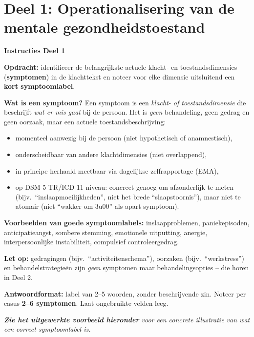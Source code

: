 \documentclass[11pt,a4paper]{article}
\begin{document}
\newpage


\section{Deel 1: Operationalisering van de mentale gezondheidstoestand}

\begin{tcolorbox}[colback=blue!3,colframe=PrimaryBlue,arc=2.5mm,boxrule=0.9pt,
  left=10pt,right=10pt,top=9pt,bottom=9pt]
\textbf{\color{PrimaryBlue}Instructies Deel 1}

\smallskip\small
\textbf{Opdracht:} identificeer de belangrijkste actuele klacht- en toestandsdimensies
(\textbf{symptomen}) in de klachttekst en noteer voor elke dimensie uitsluitend een
\textbf{kort symptoomlabel}.

\textbf{Wat is een symptoom?}
Een symptoom is een \emph{klacht- of toestandsdimensie} die beschrijft \emph{wat er
mis gaat} bij de persoon. Het is \emph{geen} behandeling, geen gedrag en geen oorzaak,
maar een actuele toestandsbeschrijving:
\begin{itemize}[topsep=2pt,itemsep=1pt]
\item momenteel aanwezig bij de persoon (niet hypothetisch of anamnestisch),
\item onderscheidbaar van andere klachtdimensies (niet overlappend),
\item in principe herhaald meetbaar via dagelijkse zelfrapportage (EMA),
\item op DSM-5-TR/ICD-11-niveau: concreet genoeg om afzonderlijk te meten (bijv.\ ``inslaapmoeilijkheden'', niet het brede ``slaapstoornis''), maar niet te atomair (niet ``wakker om 3u00'' als apart symptoom).
\end{itemize}

\textbf{Voorbeelden van goede symptoomlabels:}
inslaapproblemen, paniekepisoden, anticipatieangst, sombere stemming, emotionele uitputting,
anergie, interpersoonlijke instabiliteit, compulsief controleergedrag.

\textbf{Let op:} gedragingen (bijv.\ ``activiteitenschema''), oorzaken (bijv.\ ``werkstress'')
en behandelstrategieën zijn \emph{geen} symptomen maar behandelingsopties -- die horen in Deel 2.

\textbf{Antwoordformat:} label van 2--5 woorden, zonder beschrijvende zin.
Noteer per casus \textbf{2--6 symptomen}. Laat ongebruikte velden leeg.

\medskip
\textit{\textbf{Zie het uitgewerkte voorbeeld hieronder} voor een concrete illustratie van wat een correct symptoomlabel is.}
\end{tcolorbox}
\end{document}
